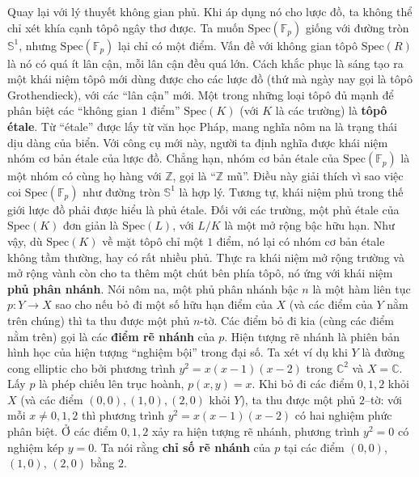 \begin{multicols}{2}
\begin{figure}[H]
		\vspace*{-10pt}
	\end{figure}
	Quay lại với lý thuyết không gian phủ. Khi áp dụng nó cho lược đồ, ta không thể chỉ xét khía cạnh tôpô ngây thơ được. Ta muốn $\text{Spec}(\mathbb{F}_p)$ giống với đường tròn $\mathbb{S}^1$, nhưng $\text{Spec}(\mathbb{F}_p)$ lại chỉ có một điểm. Vấn đề với không gian tôpô $\text{Spec}(R)$ là nó có quá ít lân cận, mỗi lân cận đều quá lớn. Cách khắc phục là sáng tạo ra một khái niệm tôpô mới dùng được cho các lược đồ (thứ mà ngày nay gọi là tôpô Grothendieck), với các ``lân cận'' mới. Một trong những loại tôpô đủ mạnh để phân biệt các ``không gian $1$ điểm'' $\text{Spec}(K)$ (với $K$ là các trường) là {\bf\color{duongvaotoanhoc} tôpô étale}. Từ ``étale'' được lấy từ văn học Pháp, mang nghĩa nôm na là trạng thái dịu dàng của biển. Với công cụ mới này, người ta định nghĩa được khái niệm nhóm cơ bản étale của lược đồ. Chẳng hạn, nhóm cơ bản étale của $\text{Spec}(\mathbb{F}_p)$ là một nhóm có cùng họ hàng với $\mathbb{Z}$, gọi là ``$\mathbb{Z}$ mũ''. Điều này giải thích vì sao việc coi $\text{Spec}(\mathbb{F}_p)$ như đường tròn $\mathbb{S}^1$ là hợp lý. Tương tự, khái niệm phủ trong thế giới lược đồ phải được hiểu là phủ étale. Đối với các trường, một phủ étale của $\text{Spec}(K)$ đơn giản là $\text{Spec}(L)$, với $L/K$ là một mở rộng bậc hữu hạn. Như vậy, dù $\text{Spec}(K)$ về mặt tôpô chỉ một $1$ điểm, nó lại có nhóm cơ bản étale không tầm thường, hay có rất nhiều phủ. 
	\vskip 0.1cm
	Thực ra khái niệm mở rộng trường và mở rộng vành còn cho ta thêm một chút bên phía tôpô, nó ứng với khái niệm {\bf\color{duongvaotoanhoc} phủ phân nhánh}. Nói nôm na, một phủ phân nhánh bậc $n$ là một hàm liên tục $p: Y \to X$ sao cho nếu bỏ đi một số hữu hạn điểm của $X$ (và các điểm của $Y$ nằm trên chúng) thì ta thu được một phủ $n$-tờ. Các điểm bỏ đi kia (cùng các điểm nằm trên) gọi là các {\bf\color{duongvaotoanhoc} điểm rẽ nhánh} của $p$. Hiện tượng rẽ nhánh là phiên bản hình học của hiện tượng ``nghiệm bội'' trong đại số. Ta xét ví dụ khi $Y$ là đường cong elliptic cho bởi phương trình $y^2=x(x-1)(x-2)$ trong $\mathbb{C}^2$ và $X = \mathbb{C}$. Lấy $p$ là phép chiếu lên trục hoành, $p(x,y) = x$. Khi bỏ đi các điểm $0, 1, 2$ khỏi $X$ (và các điểm $(0,0), (1,0), (2,0)$ khỏi $Y$), ta thu được một phủ $2$--tờ: với mỗi $x \neq 0,1,2$ thì phương trình $y^2=x(x-1)(x-2)$ có hai nghiệm phức phân biệt. Ở các điểm $0, 1, 2$ xảy ra hiện tượng rẽ nhánh, phương trình $y^2=0$ có nghiệm kép $y=0$. Ta nói rằng {\bf\color{duongvaotoanhoc} chỉ số rẽ nhánh} của $p$ tại các điểm $(0,0)$, $(1,0)$, $(2,0)$ bằng $2$.

\end{multicols}
